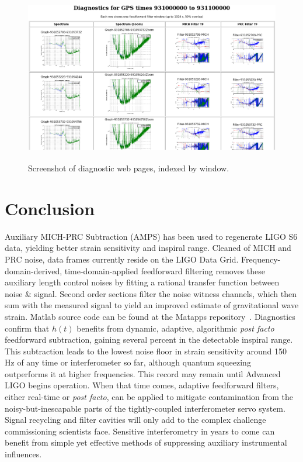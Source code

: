 \begin{figure}
\begin{center}
\includegraphics[height=75mm, width=150mm]{figure16.eps}
\caption{Screenshot of diagnostic web pages, indexed by window.}
\label{diagnosticWebpages}
\end{center}
\end{figure}


\section{Conclusion}

Auxiliary MICH-PRC Subtraction (AMPS) has been used to regenerate LIGO S6 data, yielding better strain sensitivity and inspiral range. Cleaned of MICH and PRC noise, data frames currently reside on the LIGO Data Grid. Frequency-domain-derived, time-domain-applied feedforward filtering removes these auxiliary length control noises by fitting a rational transfer function between noise \& signal. Second order sections filter the noise witness channels, which then sum with the measured signal to yield an improved estimate of gravitational wave strain. Matlab source code can be found at the Matapps repository~\cite{MatappsRepository}. Diagnostics confirm that $h(t)$ benefits from dynamic, adaptive, algorithmic \textit{post facto} feedforward subtraction, gaining several percent in the detectable inspiral range. This subtraction leads to the lowest noise floor in strain sensitivity around 150 Hz of any time or interferometer so far, although quantum squeezing~\cite{BarsottiNatureSqueezing,DwyerPhaseNoise} outperforms it at higher frequencies. This record may remain until Advanced LIGO begins operation. When that time comes, adaptive feedforward filters, either real-time or \textit{post facto}, can be applied to mitigate contamination from the noisy-but-inescapable parts of the tightly-coupled interferometer servo system. Signal recycling and filter cavities will only add to the complex challenge commissioning scientists face. Sensitive interferometry in years to come can benefit from simple yet effective methods of suppressing auxiliary instrumental influences.
 
